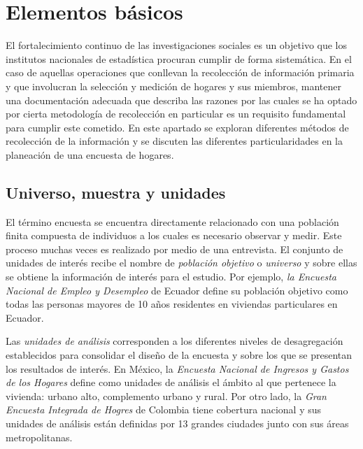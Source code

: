 \documentclass[
  10pt,
  spanish,
]{book}
\begin{document}
\hypertarget{elementos-buxe1sicos}{%
\chapter{Elementos básicos}\label{elementos-buxe1sicos}}

El fortalecimiento continuo de las investigaciones sociales es un objetivo que los institutos nacionales de estadística procuran cumplir de forma sistemática. En el caso de aquellas operaciones que conllevan la recolección de información primaria y que involucran la selección y medición de hogares y sus miembros, mantener una documentación adecuada que describa las razones por las cuales se ha optado por cierta metodología de recolección en particular es un requisito fundamental para cumplir este cometido. En este apartado se exploran diferentes métodos de recolección de la información y se discuten las diferentes particularidades en la planeación de una encuesta de hogares.

\hypertarget{universo-muestra-y-unidades}{%
\section{Universo, muestra y unidades}\label{universo-muestra-y-unidades}}

El término encuesta se encuentra directamente relacionado con una población finita compuesta de individuos a los cuales es necesario observar y medir. Este proceso muchas veces es realizado por medio de una entrevista. El conjunto de unidades de interés recibe el nombre de \emph{población objetivo} o \emph{universo} y sobre ellas se obtiene la información de interés para el estudio. Por ejemplo, \emph{la Encuesta Nacional de Empleo y Desempleo} de Ecuador define su población objetivo como todas las personas mayores de 10 años residentes en viviendas particulares en Ecuador.

Las \emph{unidades de análisis} corresponden a los diferentes niveles de desagregación establecidos para consolidar el diseño de la encuesta y sobre los que se presentan los resultados de interés. En México, la \emph{Encuesta Nacional de Ingresos y Gastos de los Hogares} define como unidades de análisis el ámbito al que pertenece la vivienda: urbano alto, complemento urbano y rural. Por otro lado, la \emph{Gran Encuesta Integrada de Hogres} de Colombia tiene cobertura nacional y sus unidades de análisis están definidas por 13 grandes ciudades junto con sus áreas metropolitanas.
\end{document}
